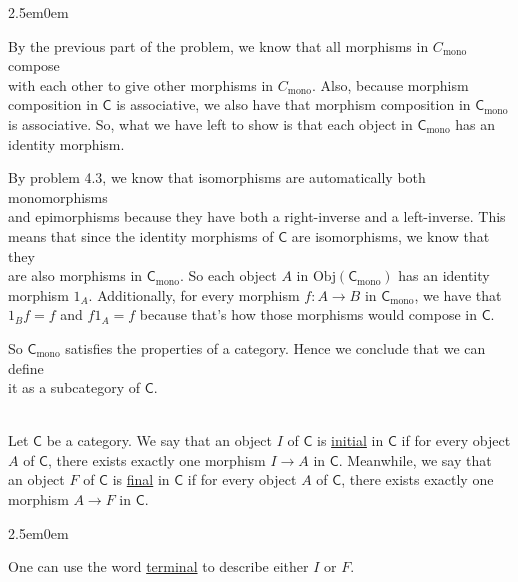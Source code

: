 \documentclass{book}
\newcommand{\hOne}{%
   \color{Black}%
   \fontsize{14}{16}\selectfont%
}
\newenvironment{myIndent}{%
   \begin{adjustwidth}{2.5em}{0em}%
}{%
   \end{adjustwidth}%
}
\newcommand{\udefine}[1]{{%
   \setulcolor{Red}%
   \setul{0.14em}{0.07em}%
   \ul{#1}%
}}
\newcommand{\myObj}{\mathrm{Obj}}
\newcommand{\mcateg}[1]{{\bm{\mathsf{#1}}}}
\newcommand{\mySepTwo}[1][.]{%
   {\noindent\color{#1}{\rule{6.5in}{0.5mm}}}\\%
}
\newcommand{\retTwo}{\hfill\bigbreak}
\begin{document}
\begin{itemize}
{\begin{myIndent}
      By the previous part of the problem, we know that all morphisms in $C_{\mathrm{mono}}$ compose\\ with each other to give other morphisms in $C_{\mathrm{mono}}$. Also, because morphism\\ composition in $\mcateg{C}$ is associative, we also have that morphism composition in $\mcateg{C}_{\mathrm{mono}}$\\ is associative. So, what we have left to show is that each object in $\mcateg{C}_{\mathrm{mono}}$ has an\\ identity morphism.

      \newpage

      By problem 4.3, we know that isomorphisms are automatically both monomorphisms\\ and epimorphisms because they have both a right-inverse and a left-inverse. This\\ means that since the identity morphisms of $\mcateg{C}$ are isomorphisms, we know that they\\ are also morphisms in $\mcateg{C}_{\mathrm{mono}}$. So each object $A$ in $\myObj(\mcateg{C}_{\mathrm{mono}})$ has an identity\\ morphism $1_A$. Additionally, for every morphism $f: A \longrightarrow B$ in $\mcateg{C}_{\mathrm{mono}}$, we have that\\ $1_B f = f$ and $f 1_A = f$ because that's how those morphisms would compose in $\mcateg{C}$.\retTwo

      So $\mcateg{C}_{\mathrm{mono}}$ satisfies the properties of a category. Hence we conclude that we can define\\ it as a subcategory of $\mcateg{C}$.
   \end{myIndent}}
\end{itemize}

\hOne\mySepTwo

Let $\mcateg{C}$ be a category. We say that an object $I$ of $\mcateg{C}$ is \udefine{initial} in $\mcateg{C}$ if for every object\\ $A$ of $\mcateg{C}$, there exists exactly one morphism $I \longrightarrow A$ in $\mcateg{C}$. Meanwhile, we say that\\ an object $F$ of $\mcateg{C}$ is \udefine{final} in $\mcateg{C}$ if for every object $A$ of $\mcateg{C}$, there exists exactly one\\ morphism $A \longrightarrow F$ in $\mcateg{C}$.
\begin{myIndent}
   One can use the word \udefine{terminal} to describe either $I$ or $F$.
\end{myIndent}
\end{document}
